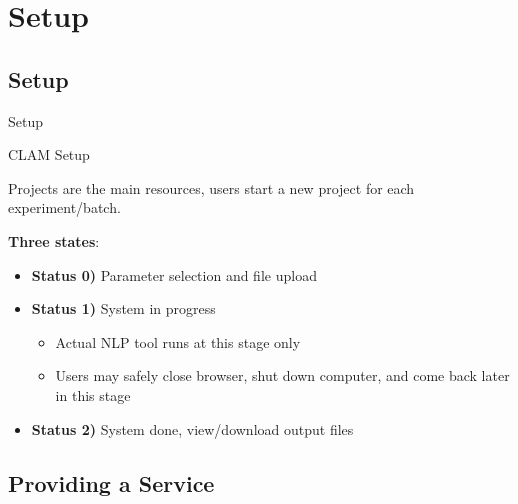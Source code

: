 \documentclass[compress]{beamer}
\begin{document}
\section{Setup}

\subsection{Setup}

\begin{frame}{Setup}
    \begin{block}{CLAM Setup}

            Projects are the main resources, users start a new project for each experiment/batch.
    
            \textbf{Three states}:

            \begin{itemize}
                \item \textbf{Status 0)} Parameter selection and file upload
                \item \textbf{Status 1)} System in progress
                \begin{itemize}
                    \item Actual NLP tool runs at this stage only
                    \item Users may safely close browser, shut down computer, and come back later in this stage
                \end{itemize}
                \item \textbf{Status 2)} System done, view/download output files
            \end{itemize}


    \end{block}
\end{frame}

\subsection{Providing a Service}
\end{document}
